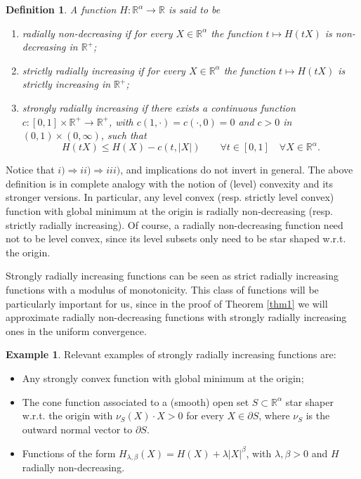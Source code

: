 \documentclass[a4paper,11pt]{article}
\numberwithin{equation}{section}
\newtheorem{Definition}[Theorem]{Definition}
\newcommand{\numberset}{\mathbb}
\newcommand{\R}{\numberset{R}}
\theoremstyle{definition}
\newtheorem{Example}[Theorem]{Example}
\begin{document}
\begin{Definition}
\indent
A function $H:\R^\alpha\to\R$ is said to be
\begin{enumerate}
\item[i)] radially non-decreasing if for every $X\in\R^\alpha$ the function $t\mapsto H(tX)$ is non-decreasing in $\R^+$;
\item[ii)] strictly radially increasing if for every $X\in\R^\alpha$ the function $t\mapsto H(tX)$ is strictly increasing in $\R^+$;
\item[iii)] strongly radially increasing if there exists a continuous function $c:[0,1]\times\R^+\to\R^+$, with $c(1,\cdot)=c(\cdot,0)=0$ and $c>0$ in $(0,1)\times(0,\infty)$, such that
$$
H(tX)\leq H(X)-c(t,|X|)\qquad\forall t\in[0,1]\quad\forall X\in\R^\alpha.
$$ 
\end{enumerate}
\end{Definition}
Notice that $i)\Rightarrow ii)\Rightarrow iii)$, and implications do not invert in general.
The above definition is in complete analogy with the notion of (level) convexity and its stronger versions. In particular, any  level convex (resp. strictly level convex) function with global minimum at the origin is radially non-decreasing (resp. strictly radially increasing). Of course, a radially non-decreasing function need not to be level convex, since its level subsets only need to be star shaped w.r.t. the origin.

Strongly radially increasing functions can be seen as strict radially increasing functions with a modulus of monotonicity. This class of functions will be particularly important for us, since in the proof of Theorem \ref{thm1} we will approximate radially non-decreasing functions with strongly radially increasing ones in the uniform convergence.


\begin{Example}\label{Ex}
Relevant examples of strongly radially increasing functions are:
\begin{itemize}
\item Any strongly convex function with global minimum at the origin;
\item The cone function associated to a (smooth) open set $S\subset\R^\alpha$ star shaper w.r.t. the origin with $\nu_{S}(X)\cdot X>0$ for every $X\in\partial S$, where $\nu_S$ is the outward normal vector to $\partial S$.
\item Functions of the form $H_{\lambda,\beta}(X)=H(X)+\lambda|X|^\beta$, with $\lambda,\beta>0$ and $H$ radially non-decreasing. 
\end{itemize}
\end{Example}
\end{document}

